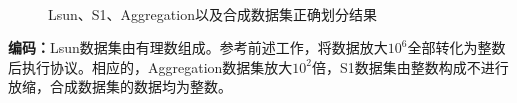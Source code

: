 \begin{figure}[htbp]
	\centering
	\\
	\caption{Lsun、S1、Aggregation以及合成数据集正确划分结果}
\end{figure}

\textbf{编码：}Lsun数据集由有理数组成。参考前述工作\cite{jaschke2019unsupervised}，将数据放大$ 10^6 $全部转化为整数后执行协议。相应的，Aggregation数据集放大$ 10^2 $倍，S1数据集由整数构成不进行放缩，合成数据集的数据均为整数。

